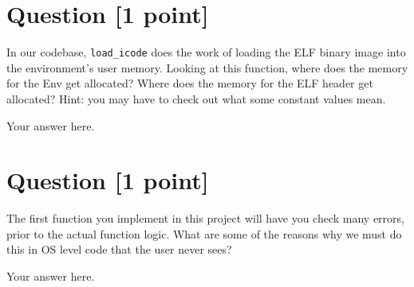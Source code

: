 \documentclass[11pt]{article}
\begin{document}
\section{Question [1 point]}

In our codebase, \texttt{load\_icode\(\)} does the work of loading the ELF binary image into the environment's user memory. Looking at this function, where does the memory for the Env get allocated? Where does the memory for the ELF header get allocated? Hint: you may have to check out what some constant values mean.

\begin{solution}
Your answer here.
\end{solution}


\section{Question [1 point]}

The first function you implement in this project will have you check many errors, prior to the actual function logic. What are some of the reasons why we must do this in OS level code that the user never sees?

\begin{solution}
Your answer here.
\end{solution}
\end{document}
